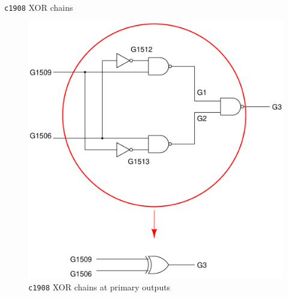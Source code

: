\begin{frame}{\texttt{c1908} XOR chains}
       \begin{figure}
                \begin{center}
                \label{fig:c1908-c-l}
                \caption{\texttt{c1908} XOR chains at primary outputs}
                        \includegraphics[scale=0.2]{fig/c1908-xor-chains.pdf}
                \end{center}
        \end{figure}

\end{frame}

